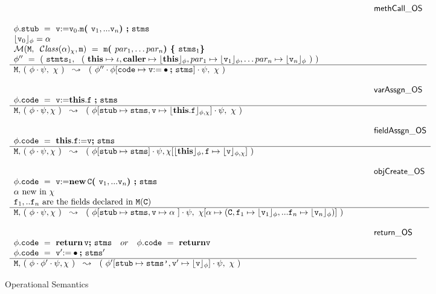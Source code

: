 \begin{figure*}
$\begin{array}{l}
\inferenceruleNN {methCall\_OS} { 
\\
\phi.\prg{stub}\ =\ \v {\kw{:= }} \v_0.\m \lp \v_1, ... \v_n \rp \semi \prg{stms}
\\ 
\interp{\v_0}{\phi} = \alpha 
\\
\Meths {} {\ClassOf {\alpha} {\chi}} {\m} \  =  \ \m\lp par_1, \ldots par_n \rp \lb \prg{stms}_1   \rb
  \\
 \phi''\ =\  (\  \prg{stmts}_1,\ \ (\ \this \mapsto \iota, \caller \mapsto  \interp{\this}{\phi}, par_1 \mapsto  \interp{\v_1}{\phi}, \ldots par_n \mapsto  \interp{\v_n}{\phi}\ ) \ )
}
{
 \M,\, (\ \phi\cdot\psi,\ \chi\ )\ \ \leadsto\  \ (\ \phi''\cdot\phi[\prg{code}\mapsto\v  \kw{:=} \bullet \semi \prg{stms}] \cdot\psi,\ \chi\ ) 
}

\\ \\
\inferenceruleNN {varAssgn\_OS} {
 \phi.\prg{code} \ = \ \v  {\kw{:= }}   \this.\f \ \semi \prg{stms}
}
{
 \M,\,  (\ \phi\cdot\psi, \chi\ )\ \ \leadsto\  \ (\ \phi[ \prg{stub} \mapsto \prg{stms}, \v\mapsto \interp{\this.\f}{\phi,\chi}] \cdot\psi,\ \chi\  )
}
\\
\\
\inferenceruleNN{fieldAssgn\_OS} {
 \phi.\prg{code}\ =\  \this.\f  \kw{:=} \v  \semi \prg{stms}
}
{
 \M,\,  (\ \phi\cdot\psi, \chi\  )\ \ \leadsto\  \ (\ \phi[\prg{stub}\mapsto  \prg{stms} ] \cdot\psi, \chi[\interp{\this}{\phi},\f \mapsto \interp{\v}{\phi,\chi}]\  ) 
}
\\
\\
\inferenceruleNN {objCreate\_OS} {
 \phi.\prg{code}\ =\  \v  \kw{:=} \kw{new }\, \c \lp \v_1, ... \v_n \rp  \semi \prg{stms}
 \\
 \alpha\ \mbox{new in}\ \chi
 \\
\f_1, .. \f_n\ \mbox{are the fields declared in } \M(\c)
}
{
 \M,\,  (\ \phi\cdot\psi, \chi\ )\ \ \leadsto\  \ (\ \phi[\prg{stub}\mapsto  \prg{stms},\v \mapsto \alpha\ ] \cdot\psi, \ \chi[\alpha \mapsto (\c,\f_1 \mapsto \interp{\v_1}{\phi},  ... \f_n \mapsto \interp{\v_n}{\phi}  ) ]\ ) 
}
\\
\\
\inferenceruleNN {return\_OS} {
 \phi.\prg{code}\ =\   {\kw {return }}\, \v  \semi \prg{stms}\ \  \ or\  \ \  \phi.\prg{code}\ =\   {\kw{return}} \v 
 \\
\phi.\prg{code}\ =\  \v' \kw{:=} \bullet  \semi \prg{stms}'
}
{
 \M,\,  (\ \phi\cdot\phi'\cdot\psi, \chi\ )\ \ \leadsto\  \ (\ \phi'[\prg{stub}\mapsto  \prg{stms'},\v' \mapsto \interp{\v}{\phi}] \cdot\psi, \ \chi \ ) 
}
\end{array}
$
\caption{Operational Semantics}
\label{fig:Execution}
\end{figure*}




